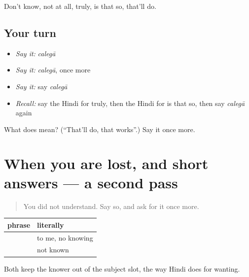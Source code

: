\begin{grammarlens}[title={What you've built}]
Don't know, not at all, truly, is that so, that'll do.
\end{grammarlens}

\subsection*{Your turn}
\begin{itemize}
\raggedright
  \item \emph{Say it:} \emph{calegā}
  \item \emph{Say it:} \emph{calegā}, once more
  \item \emph{Say it:} say \emph{calegā}
  \item \emph{Recall:} say the Hindi for truly, then the Hindi for is that so, then say \emph{calegā} again
\end{itemize}

\begin{tcolorbox}[breakable,colback=teal!4,colframe=teal!35!black,title={Before you move on}]
What does  mean? (\textquotedblleft{}That'll do, that works\textquotedblright{}.) Say it once more.
\end{tcolorbox}
\section[(dialogue)]{When you are lost, and short answers — a second pass}

\label{lesson:HI-R127-second-pass-repair}



\begin{quote}
You did not understand. Say so, and ask for it once more.
\end{quote}

\begin{grammarlens}[title={Grammar Lens: two ways to say I don't know}]
\noindent
\begin{tabularx}{\linewidth}{@{}>{\raggedright\arraybackslash}X>{\raggedright\arraybackslash}X@{}}
\toprule
\textbf{phrase} & \textbf{literally} \\
\midrule
\textbf{\hi{मुझे} \hi{नहीं} \hi{पता}} & to me, no knowing \\
\textbf{\hi{मालूम} \hi{नहीं}} & not known \\
\bottomrule
\end{tabularx}

Both keep the knower out of the subject slot, the way Hindi does for wanting.
\end{grammarlens}

